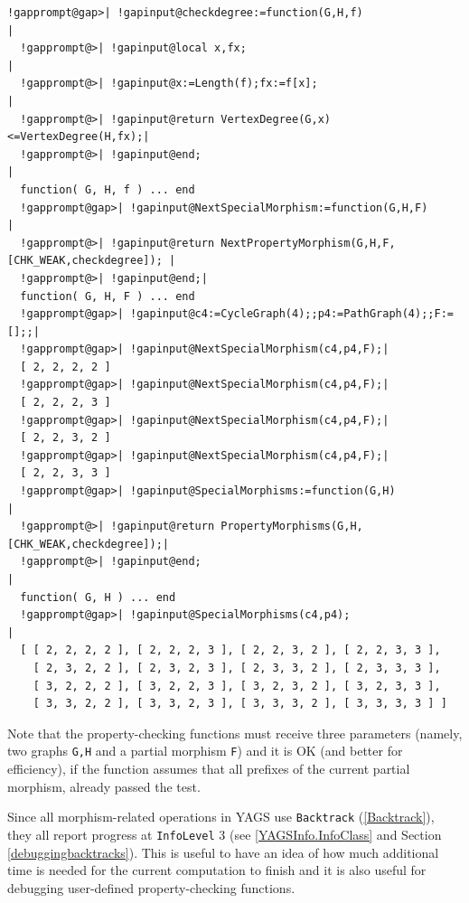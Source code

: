 \documentclass[a4paper,11pt]{report}
\begin{document}
{{ 
\begin{Verbatim}[commandchars=!@|,fontsize=\small,frame=single,label=Example]
  !gapprompt@gap>| !gapinput@checkdegree:=function(G,H,f)                |
  !gapprompt@>| !gapinput@local x,fx;                                 |
  !gapprompt@>| !gapinput@x:=Length(f);fx:=f[x];                      |
  !gapprompt@>| !gapinput@return VertexDegree(G,x)<=VertexDegree(H,fx);|
  !gapprompt@>| !gapinput@end;                                         |
  function( G, H, f ) ... end
  !gapprompt@gap>| !gapinput@NextSpecialMorphism:=function(G,H,F)                   |
  !gapprompt@>| !gapinput@return NextPropertyMorphism(G,H,F,[CHK_WEAK,checkdegree]); |
  !gapprompt@>| !gapinput@end;|
  function( G, H, F ) ... end
  !gapprompt@gap>| !gapinput@c4:=CycleGraph(4);;p4:=PathGraph(4);;F:=[];;|
  !gapprompt@gap>| !gapinput@NextSpecialMorphism(c4,p4,F);|
  [ 2, 2, 2, 2 ]
  !gapprompt@gap>| !gapinput@NextSpecialMorphism(c4,p4,F);|
  [ 2, 2, 2, 3 ]
  !gapprompt@gap>| !gapinput@NextSpecialMorphism(c4,p4,F);|
  [ 2, 2, 3, 2 ]
  !gapprompt@gap>| !gapinput@NextSpecialMorphism(c4,p4,F);|
  [ 2, 2, 3, 3 ]
  !gapprompt@gap>| !gapinput@SpecialMorphisms:=function(G,H)                     |
  !gapprompt@>| !gapinput@return PropertyMorphisms(G,H,[CHK_WEAK,checkdegree]);|
  !gapprompt@>| !gapinput@end;                                                 |
  function( G, H ) ... end
  !gapprompt@gap>| !gapinput@SpecialMorphisms(c4,p4);                             |
  [ [ 2, 2, 2, 2 ], [ 2, 2, 2, 3 ], [ 2, 2, 3, 2 ], [ 2, 2, 3, 3 ], 
    [ 2, 3, 2, 2 ], [ 2, 3, 2, 3 ], [ 2, 3, 3, 2 ], [ 2, 3, 3, 3 ], 
    [ 3, 2, 2, 2 ], [ 3, 2, 2, 3 ], [ 3, 2, 3, 2 ], [ 3, 2, 3, 3 ], 
    [ 3, 3, 2, 2 ], [ 3, 3, 2, 3 ], [ 3, 3, 3, 2 ], [ 3, 3, 3, 3 ] ]
\end{Verbatim}
 

Note that the property-checking functions must receive three parameters
(namely, two graphs \texttt{G,H} and a partial morphism \texttt{F}) and it is OK (and better for efficiency), if the function assumes that all
prefixes of the current partial morphism, already passed the test. 

Since all morphism-related operations in \textsf{YAGS} use \texttt{Backtrack} (\ref{Backtrack}), they all report progress at \texttt{InfoLevel} 3 (see \ref{YAGSInfo.InfoClass} and Section \ref{debuggingbacktracks}). This is useful to have an idea of how much additional time is needed for
the current computation to finish and it is also useful for debugging
user-defined property-checking functions. }

 }
\end{document}
